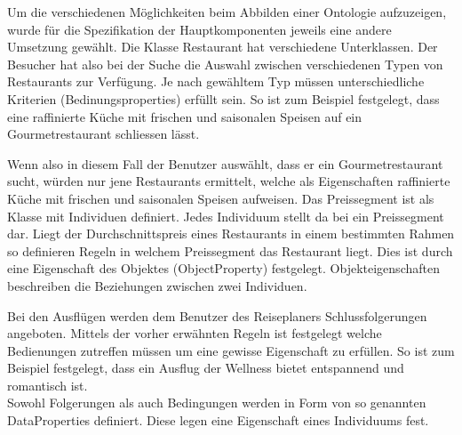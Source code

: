 Um die verschiedenen Möglichkeiten beim Abbilden einer Ontologie aufzuzeigen, wurde für die Spezifikation der Hauptkomponenten jeweils eine andere Umsetzung gewählt. Die Klasse Restaurant hat verschiedene Unterklassen. Der Besucher hat also bei der Suche die Auswahl zwischen verschiedenen Typen von Restaurants zur Verfügung. Je nach gewähltem Typ müssen unterschiedliche Kriterien (Bedinungsproperties) erfüllt sein. So ist zum Beispiel festgelegt, dass eine raffinierte Küche mit frischen und saisonalen Speisen auf ein Gourmetrestaurant schliessen lässt.

Wenn also in diesem Fall der Benutzer auswählt, dass er ein Gourmetrestaurant sucht, würden nur jene Restaurants ermittelt, welche als Eigenschaften raffinierte Küche mit frischen und saisonalen Speisen aufweisen. Das Preissegment ist als Klasse mit Individuen definiert. Jedes Individuum stellt da bei ein Preissegment dar. Liegt der Durchschnittspreis eines Restaurants in einem bestimmten Rahmen so definieren Regeln in welchem Preissegment das Restaurant liegt.  Dies ist durch eine Eigenschaft des Objektes (ObjectProperty) festgelegt. Objekteigenschaften beschreiben die Beziehungen zwischen zwei Individuen.

Bei den Ausflügen werden dem Benutzer des Reiseplaners Schlussfolgerungen angeboten. Mittels der vorher erwähnten Regeln ist festgelegt welche Bedienungen zutreffen müssen um eine gewisse Eigenschaft zu erfüllen. So ist zum Beispiel festgelegt, dass ein Ausflug der Wellness bietet entspannend und romantisch ist.\\
Sowohl Folgerungen als auch Bedingungen werden in Form von so genannten DataProperties definiert. Diese legen eine Eigenschaft eines Individuums fest.

